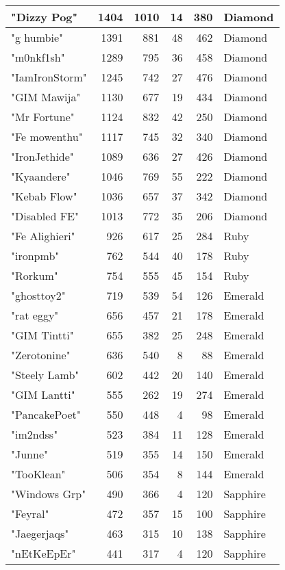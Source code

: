 \documentclass{article}
\begin{document}
\begin{table}[htbp]
\begin{tabular}{|l|r|r|r|r|l|}
"Dizzy Pog" & 1404 & 1010 & 14 & 380 & Diamond \\ \hline
"g humbie" & 1391 & 881 & 48 & 462 & Diamond \\ \hline
"m0nkf1sh" & 1289 & 795 & 36 & 458 & Diamond \\ \hline
"IamIronStorm" & 1245 & 742 & 27 & 476 & Diamond \\ \hline
"GIM Mawija" & 1130 & 677 & 19 & 434 & Diamond \\ \hline
"Mr Fortune" & 1124 & 832 & 42 & 250 & Diamond \\ \hline
"Fe mowenthu" & 1117 & 745 & 32 & 340 & Diamond \\ \hline
"IronJethide" & 1089 & 636 & 27 & 426 & Diamond \\ \hline
"Kyaandere" & 1046 & 769 & 55 & 222 & Diamond \\ \hline
"Kebab Flow" & 1036 & 657 & 37 & 342 & Diamond \\ \hline
"Disabled FE" & 1013 & 772 & 35 & 206 & Diamond \\ \hline
"Fe Alighieri" & 926 & 617 & 25 & 284 & Ruby \\ \hline
"ironpmb" & 762 & 544 & 40 & 178 & Ruby \\ \hline
"Rorkum" & 754 & 555 & 45 & 154 & Ruby \\ \hline
"ghosttoy2" & 719 & 539 & 54 & 126 & Emerald \\ \hline
"rat eggy" & 656 & 457 & 21 & 178 & Emerald \\ \hline
"GIM Tintti" & 655 & 382 & 25 & 248 & Emerald \\ \hline
"Zerotonine" & 636 & 540 & 8 & 88 & Emerald \\ \hline
"Steely Lamb" & 602 & 442 & 20 & 140 & Emerald \\ \hline
"GIM Lantti" & 555 & 262 & 19 & 274 & Emerald \\ \hline
"PancakePoet" & 550 & 448 & 4 & 98 & Emerald \\ \hline
"im2ndss" & 523 & 384 & 11 & 128 & Emerald \\ \hline
"Junne" & 519 & 355 & 14 & 150 & Emerald \\ \hline
"TooKlean" & 506 & 354 & 8 & 144 & Emerald \\ \hline
"Windows Grp" & 490 & 366 & 4 & 120 & Sapphire \\ \hline
"Feyral" & 472 & 357 & 15 & 100 & Sapphire \\ \hline
"Jaegerjaqs" & 463 & 315 & 10 & 138 & Sapphire \\ \hline
"nEtKeEpEr" & 441 & 317 & 4 & 120 & Sapphire \\ \hline

\end{tabular}
\end{table}
\end{document}
